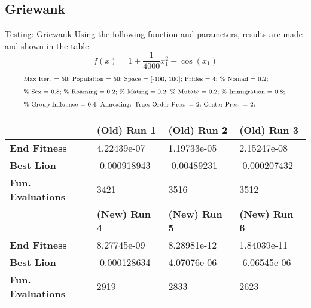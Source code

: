 \documentclass[xcolor=table]{beamer}
\begin{document}
\subsection{Griewank}
\begin{frame}{Testing: Griewank}
  Using the following function and parameters, results are made and shown in the table.
  $$
    f(x) = 1 + \frac{1}{4000}x_1^2 - \cos(x_1)
  $$
  \begin{align*}
    &\text{\scriptsize
      Max Iter. = 50; Population = 50; Space = [-100, 100]; Prides = 4;  \% Nomad = 0.2;
    }\\
    &\text{\scriptsize
      \% Sex = 0.8; \% Roaming = 0.2; \% Mating = 0.2; \% Mutate = 0.2; \% Immigration = 0.8;
    }\\
    &\text{\scriptsize
       \% Group Influence = 0.4; Annealing: True; Order Pres. = 2; Center Pres. = 2;
    }
  \end{align*}
  \begin{table}[]
    \small
  \begin{tabular}{l|l|l|l|}
  \cline{2-4}
                                                  & \textbf{(Old) Run 1} & \textbf{(Old) Run 2} & \textbf{(Old) Run 3} \\ \hline
  \multicolumn{1}{|l|}{\textbf{End Fitness}}      & 4.22439e-07           & 1.19733e-05            & 2.15247e-08            \\ \hline
  \multicolumn{1}{|l|}{\textbf{Best Lion}}        & -0.000918943     & -0.00489231     & -0.000207432   \\ \hline
  \multicolumn{1}{|l|}{\textbf{Fun. Evaluations}} & 3421                 & 3516                 & 3512                 \\ \hline
                                                  & \textbf{(New) Run 4} & \textbf{(New) Run 5} & \textbf{(New) Run 6} \\ \hline
  \multicolumn{1}{|l|}{\textbf{End Fitness}}      & 8.27745e-09           & 8.28981e-12          & 1.84039e-11          \\ \hline
  \multicolumn{1}{|l|}{\textbf{Best Lion}}        & -0.000128634      & 4.07076e-06    & -6.06545e-06   \\ \hline
  \multicolumn{1}{|l|}{\textbf{Fun. Evaluations}} & 2919                 & 2833                 & 2623                 \\ \hline
  \end{tabular}
  \end{table}
\end{frame}
\end{document}
